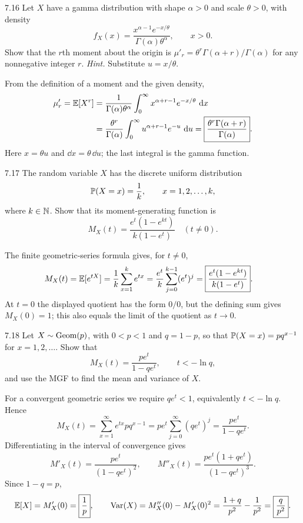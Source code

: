 \documentclass[11pt,oneside]{article}
\begin{document}

\begin{exercise}{7.16}
Let $X$ have a gamma distribution with shape $\alpha>0$ and scale $\theta>0$, with density
\[
f_X(x)=\frac{x^{\alpha-1}e^{-x/\theta}}{\Gamma(\alpha)\theta^\alpha}, \qquad x>0.
\]
Show that the $r$th moment about the origin is $\mu'_r=\theta^r\Gamma(\alpha+r)/\Gamma(\alpha)$ for any nonnegative integer $r$. \textit{Hint.} Substitute $u=x/\theta$.
\end{exercise}
\begin{solution}
From the definition of a moment and the given density,
\[
\begin{aligned}
\mu'_r=\mathbb{E}[X^r]
&=\frac{1}{\Gamma(\alpha)\theta^\alpha}\int_0^\infty x^{\alpha+r-1}e^{-x/\theta}\,\mathop{}\!\mathrm{d} x\\
&=\frac{\theta^r}{\Gamma(\alpha)}\int_0^\infty u^{\alpha+r-1}e^{-u}\,\mathop{}\!\mathrm{d} u
=\boxed{\frac{\theta^r\Gamma(\alpha+r)}{\Gamma(\alpha)}}.
\end{aligned}
\]
Here $x=\theta u$ and $\dd x=\theta\,\dd u$; the last integral is the gamma function.
\end{solution}

\begin{exercise}{7.17}
The random variable $X$ has the discrete uniform distribution
\[
\mathbb{P}(X=x)=\frac1k, \qquad x=1, 2, \ldots, k,
\]
where $k\in\mathbb{N}$. Show that its moment-generating function is
\[
M_X(t)=\frac{e^t(1-e^{kt})}{k(1-e^t)}\quad(t\ne0).
\]
\end{exercise}
\begin{solution}
The finite geometric-series formula gives, for $t\ne0$,
\[
\begin{aligned}
M_X(t)=\mathbb{E}[e^{tX}]
&=\frac1k\sum_{x=1}^k e^{tx}
=\frac{e^t}{k}\sum_{j=0}^{k-1}(e^t)^j
=\boxed{\frac{e^t(1-e^{kt})}{k(1-e^t)}}.
\end{aligned}
\]
At $t=0$ the displayed quotient has the form $0/0$, but the defining sum gives $\boxed{M_X(0)=1}$; this also equals the limit of the quotient as $t\to0$.
\end{solution}

\begin{exercise}{7.18}
Let $X\sim\operatorname{Geom}(p)$, with $0<p<1$ and $q=1-p$, so that $\mathbb{P}(X=x)=pq^{x-1}$ for $x=1, 2, \ldots$. Show that
\[
M_X(t)=\frac{pe^t}{1-qe^t}, \qquad t<-\ln q,
\]
and use the MGF to find the mean and variance of $X$.
\end{exercise}
\begin{solution}
For a convergent geometric series we require $qe^t<1$, equivalently $t<-\ln q$. Hence
\[
M_X(t)=\sum_{x=1}^\infty e^{tx}pq^{x-1}
=pe^t\sum_{j=0}^\infty(qe^t)^j
=\boxed{\frac{pe^t}{1-qe^t}}.
\]
Differentiating in the interval of convergence gives
\[
M'_X(t)=\frac{pe^t}{(1-qe^t)^2}, \qquad
M''_X(t)=\frac{pe^t(1+qe^t)}{(1-qe^t)^3}.
\]
Since $1-q=p$,
\[
\mathbb{E}[X]=M'_X(0)=\boxed{\frac1p}, \qquad
\operatorname{Var}(X)=M''_X(0)-M'_X(0)^2
=\frac{1+q}{p^2}-\frac1{p^2}=\boxed{\frac{q}{p^2}}.
\]
\end{solution}
\end{document}
